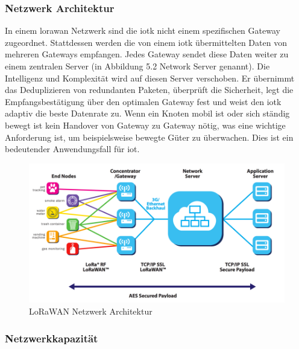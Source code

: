 \subsubsection*{Netzwerk Architektur}

In einem \gls{lorawan} Netzwerk sind die \gls{iotk} nicht einem spezifischen Gateway zugeordnet. Stattdessen werden die von einem \gls{iotk} übermittelten Daten von mehreren Gateways empfangen. Jedes Gateway sendet diese Daten weiter zu einem zentralen Server (in Abbildung 5.2 Network Server genannt). Die Intelligenz und Komplexität wird auf diesen Server verschoben. Er übernimmt das Deduplizieren von redundanten Paketen, überprüft die Sicherheit, legt die Empfangsbestätigung über den optimalen Gateway fest und weist den \gls{iotk} adaptiv die beste Datenrate zu. Wenn ein Knoten mobil ist oder sich ständig bewegt ist kein Handover von Gateway zu Gateway nötig, was eine wichtige Anforderung ist, um beispielsweise bewegte Güter zu überwachen. Dies ist ein bedeutender Anwendungsfall für \acrshort{iot}.

\begin{figure}[H]
     \centering
        \includegraphics[width=1.0\textwidth]{pictures/lorawan-network-architecture.png}
    \caption{LoRaWAN Netzwerk Architektur}
    \label{fig:LoRaWAN Netzwerk Architektur}
\end{figure}

\subsubsection*{Netzwerkkapazität}

